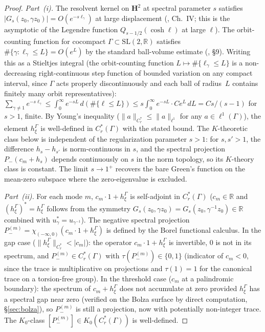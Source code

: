\begin{proof}
\emph{Part~(i).}
The resolvent kernel on $\mathbf{H}^2$ at spectral parameter
$s$ satisfies
$|G_s(z_0, \gamma z_0)| = O(e^{-s\ell_\gamma})$ at large
displacement
(\citealt{Helgason1984}, Ch.~IV;
this is the asymptotic of the Legendre function
$Q_{s-1/2}(\cosh \ell)$ at large $\ell$).
The orbit-counting function for cocompact
$\Gamma \subset \mathrm{SL}(2,\mathbb{R})$ satisfies
$\#\{\gamma : \ell_\gamma \le L\} = O(e^L)$ by the
standard ball-volume estimate
(\citealt{Buser1992}, \S 9).
Writing this as a Stieltjes integral (the orbit-counting
function $L \mapsto \#\{\ell_\gamma \le L\}$ is a
non-decreasing right-continuous step function of bounded
variation on any compact interval, since $\Gamma$ acts
properly discontinuously and each ball of radius~$L$
contains finitely many orbit representatives):
$\sum_{\gamma \ne 1} e^{-s\ell_\gamma}
\le \int_0^\infty e^{-sL}\,d(\#\{\ell \le L\})
\le s \int_0^\infty e^{-sL} \cdot C e^L\,dL
= Cs/(s-1)$
for $s > 1$, finite.
By Young's inequality
($\|a\|_{C^*_r} \le \|a\|_{\ell^1}$ for any
$a \in \ell^1(\Gamma)$), the element
$h_\xi^\Gamma$ is well-defined in $C^*_r(\Gamma)$
with the stated bound.
The $K$-theoretic class below is independent of the
regularization parameter $s > 1$: for $s, s' > 1$,
the difference $h_s - h_{s'}$ is norm-continuous
in $s$, and the spectral projection
$P_-(c_m + h_s)$ depends continuously on $s$ in the
norm topology, so its $K$-theory class is constant.
The limit $s \to 1^+$ recovers the bare Green's
function on the mean-zero subspace where the
zero-eigenvalue is excluded.

\emph{Part~(ii).}
For each mode $m$, $c_m\cdot 1 + h_\xi^\Gamma$ is self-adjoint
in $C^*_r(\Gamma)$ ($c_m \in \mathbb{R}$ and
$(h_\xi^\Gamma)^* = h_\xi^\Gamma$ follows from the symmetry
$G_s(z_0,\gamma z_0) = G_s(z_0, \gamma^{-1} z_0) \in \mathbb{R}$
combined with $u_\gamma^* = u_{\gamma^{-1}}$).
The negative spectral projection
$P_-^{(m)} = \chi_{(-\infty,0)}(c_m\cdot 1 + h_\xi^\Gamma)$
is defined by the Borel functional calculus.
In the gap case ($\|h_\xi^\Gamma\|_{C^*_r} < |c_m|$):
the operator $c_m\cdot 1 + h_\xi^\Gamma$ is invertible,
$0$ is not in its spectrum, and
$P_-^{(m)} \in C^*_r(\Gamma)$ with
$\tau(P_-^{(m)}) \in \{0, 1\}$
(indicator of $c_m < 0$, since the trace is multiplicative
on projections and $\tau(1) = 1$ for the canonical
trace on a torsion-free group).
In the threshold case ($c_m$ at a palindromic
boundary): the spectrum of $c_m + h_\xi^\Gamma$
does not accumulate at zero provided
$h_\xi^\Gamma$ has a spectral gap near zero
(verified on the Bolza surface by direct computation,
\S\ref{sec:bolza}), so $P_-^{(m)}$ is still a projection,
now with potentially non-integer trace.
The $K_0$-class $[P_-^{(m)}] \in K_0(C^*_r(\Gamma))$
is well-defined.


\end{proof}
